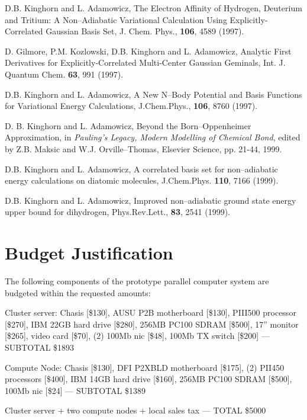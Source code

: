 \begin{thebibliography}{999}


D.B. Kinghorn and L. Adamowicz,
The Electron Affinity of Hydrogen, Deuterium and Tritium:
A Non--Adiabatic Variational Calculation Using Explicitly-Correlated
Gaussian Basis Set, J. Chem. Phys.,
{\bf 106}, 4589 (1997).



D. Gilmore, P.M. Kozlowski, D.B. Kinghorn and
L. Adamowicz, Analytic First Derivatives for
Explicitly-Correlated Multi-Center Gaussian Geminals,
Int. J. Quantum Chem. {\bf 63}, 991 (1997).


D.B. Kinghorn and L. Adamowicz,
A New N--Body Potential and Basis Functions for
Variational Energy Calculations,
J.Chem.Phys., {\bf 106}, 8760 (1997).

D. B. Kinghorn and L. Adamowicz,
Beyond the Born--Oppenheimer Approximation,
in {\em Pauling's Legacy,
Modern Modelling of Chemical Bond},
edited by Z.B. Maksic and W.J. Orville--Thomas,
Elsevier Science, pp. 21-44, 1999.



D.B. Kinghorn and L. Adamowicz,
A correlated basis set for non--adiabatic energy
calculations on diatomic molecules,
J.Chem.Phys. {\bf 110}, 7166 (1999).




D.B. Kinghorn and L. Adamowicz,
Improved non--adiabatic ground state energy
upper bound for dihydrogen,
Phys.Rev.Lett., {\bf 83}, 2541 (1999).




\end{thebibliography}


\newpage


\section{Budget Justification}
The following components of the prototype parallel computer system are
budgeted within
the requested amounts:

\noindent
Cluster server:
Chasis [\$130], AUSU P2B motherboard [\$130], 
PIII500 processor
[\$270],
IBM 22GB hard drive [\$280], 256MB PC100 SDRAM [\$500],
17'' monitor [\$265], video card [\$70], (2) 100Mb nic [\$48], 100Mb TX
switch [\$200] --- SUBTOTAL \$1893

\noindent
Compute Node:
Chasis [\$130], DFI P2XBLD motherboard [\$175], 
(2) PII450 processors
[\$400], IBM 14GB hard drive [\$160],
256MB PC100 SDRAM [\$500], 100Mb nic [\$24] --- SUBTOTAL
\$1389

\noindent
Cluster server + two compute nodes + local sales tax --- TOTAL \$5000









